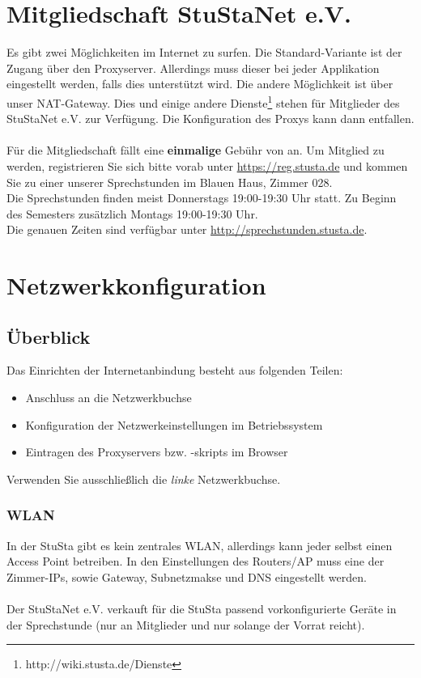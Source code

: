\documentclass[a4paper,12pt]{scrartcl}
\begin{document}
\section*{Mitgliedschaft StuStaNet e.V.}
Es gibt zwei Möglichkeiten im Internet zu surfen. Die Standard-Variante ist der Zugang über den Proxyserver. Allerdings muss dieser bei jeder Applikation eingestellt werden, falls dies unterstützt wird. Die andere Möglichkeit ist über unser NAT-Gateway. Dies und einige andere Dienste\footnote{http://wiki.stusta.de/Dienste} stehen für Mitglieder des StuStaNet e.V. zur Verfügung. Die Konfiguration des Proxys kann dann entfallen.
\\
\\
Für die Mitgliedschaft fällt eine \textbf{einmalige} Gebühr von  an. Um Mitglied zu werden, registrieren Sie sich bitte vorab unter \mbox{\url{https://reg.stusta.de}} und kommen Sie zu einer unserer Sprechstunden im Blauen Haus, Zimmer 028. 
\\
Die Sprechstunden finden meist Donnerstags 19:00-19:30 Uhr statt. Zu Beginn des Semesters zusätzlich Montags 19:00-19:30 Uhr.
\\
Die genauen Zeiten sind verfügbar unter \mbox{\url{http://sprechstunden.stusta.de}}.

\section*{Netzwerkkonfiguration}
\subsection*{Überblick}

Das Einrichten der Internetanbindung besteht aus folgenden Teilen:
\begin{itemize}
	\item Anschluss an die Netzwerkbuchse
	\item Konfiguration der Netzwerkeinstellungen im Betriebssystem
	\item Eintragen des Proxyservers bzw. -skripts im Browser
\end{itemize}
Verwenden Sie ausschließlich die \emph{linke} Netzwerkbuchse. 
 


\subsubsection*{WLAN}
In der StuSta gibt es kein zentrales WLAN, allerdings kann jeder selbst einen Access Point betreiben. In den Einstellungen des Routers/AP muss eine der Zimmer-IPs, sowie Gateway, Subnetzmakse und DNS eingestellt werden.
\\
\\
Der StuStaNet e.V. verkauft für die StuSta passend vorkonfigurierte Geräte in der Sprechstunde (nur an Mitglieder und nur solange der Vorrat reicht).
\end{document}
